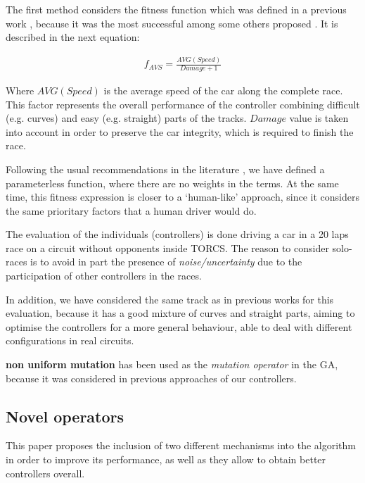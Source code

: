 \documentclass[10pt,journal,compsoc]{IEEEtran}
\begin{document}
The first method considers the fitness function which was defined in a previous work \cite{salem_cig2018}, because it was the most successful among some others proposed \cite{salem_evo18}. It is described in the next equation:

 \begin{equation} \label{fit2}
 	\begin{array}{lll}
 		f_{AVS}= \frac{AVG(Speed)}{Damage+1}
 	\end{array}
 \end{equation}	

Where $AVG(Speed)$ is the average speed of the car along the complete race. This factor represents the overall performance of the controller combining difficult (e.g. curves) and easy (e.g. straight) parts of the tracks. $Damage$ value is taken into account in order to preserve the car integrity, which is required to finish the race.

Following the usual recommendations in the literature \cite{Harik-ParameterLess99}, we have defined a parameterless function, where there are no weights in the terms.
At the same time, this fitness expression is closer to a `human-like' approach, since it considers the same prioritary factors that a human driver would do.

The evaluation of the individuals (controllers) is done driving a car in a 20 laps race on a circuit without opponents inside TORCS. The reason to consider solo-races is to avoid in part the presence of \textit{noise/uncertainty} due to the participation of other controllers \cite{merelo2016statistical} in the races.

In addition, we have considered the same track as in previous works
\cite{salem_cig2018} for this evaluation, because it has a good mixture of 
curves and straight parts, aiming to optimise the controllers for a more general behaviour, able to deal with different configurations in real circuits.

\textbf{non uniform mutation} \cite{mutation1997} has been used as the \textit{mutation operator} in the GA, because it was considered in previous approaches of our controllers. 


\subsection{Novel operators}

This paper proposes the inclusion of two different mechanisms into the algorithm in order to improve its performance, as well as they allow to obtain better controllers overall.
\end{document}
